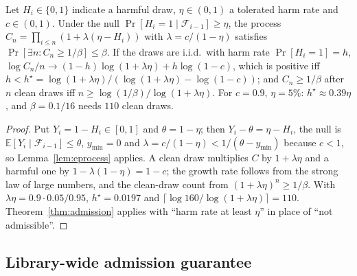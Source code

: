 \begin{proposition}\label{prop:harm}
Let $H_i\in\{0,1\}$ indicate a harmful draw, $\eta\in(0,1)$ a tolerated harm rate and $c\in(0,1)$.  Under the null
$\Pr[H_i=1\mid\mathcal{F}_{i-1}]\ge\eta$, the process $C_n=\prod_{i\le n}(1+\lambda(\eta-H_i))$ with $\lambda=c/(1-\eta)$ satisfies
$\Pr[\exists n: C_n\ge1/\beta]\le\beta$.  If the draws are i.i.d.\ with harm rate $\Pr[H_i=1]=h$, $\log C_n/n\to(1-h)\log(1+\lambda\eta)+h\log(1-c)$, which is positive
iff $h<h^\star=\log(1+\lambda\eta)/(\log(1+\lambda\eta)-\log(1-c))$; and $C_n\ge1/\beta$ after $n$ clean draws iff
$n\ge\log(1/\beta)/\log(1+\lambda\eta)$.  For $c=0.9$, $\eta=5\%$: $h^\star\approx0.39\eta$, and $\beta=0.1/16$ needs $110$ clean draws.
\end{proposition}

\begin{proof}
Put $Y_i=1-H_i\in[0,1]$ and $\theta=1-\eta$; then $Y_i-\theta=\eta-H_i$, the null is $\mathbb{E}[Y_i\mid\mathcal{F}_{i-1}]\le\theta$,
$y_{\min}=0$ and $\lambda=c/(1-\eta)<1/(\theta-y_{\min})$ because $c<1$, so Lemma~\ref{lem:eprocess} applies.  A clean draw multiplies
$C$ by $1+\lambda\eta$ and a harmful one by $1-\lambda(1-\eta)=1-c$; the growth rate follows from the strong law of large numbers,
and the clean-draw count from $(1+\lambda\eta)^n\ge1/\beta$.  With $\lambda\eta=0.9\cdot0.05/0.95$, $h^\star=0.0197$ and
$\lceil\log 160/\log(1+\lambda\eta)\rceil=110$.  Theorem~\ref{thm:admission} applies with ``harm rate at least $\eta$'' in place of
``not admissible''.
\end{proof}

\subsection{Library-wide admission guarantee}

